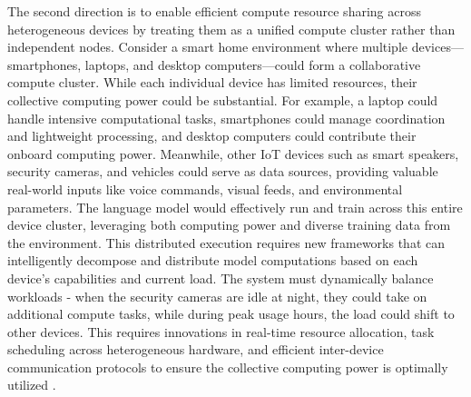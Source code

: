 The second direction is to enable efficient compute resource sharing across heterogeneous devices by treating them as a unified compute cluster rather than independent nodes. Consider a smart home environment where multiple devices—smartphones, laptops, and desktop computers—could form a collaborative compute cluster. While each individual device has limited resources, their collective computing power could be substantial. For example, a laptop could handle intensive computational tasks, smartphones could manage coordination and lightweight processing, and desktop computers could contribute their onboard computing power. Meanwhile, other IoT devices such as smart speakers, security cameras, and vehicles could serve as data sources, providing valuable real-world inputs like voice commands, visual feeds, and environmental parameters. The language model would effectively run and train across this entire device cluster, leveraging both computing power and diverse training data from the environment.
This distributed execution requires new frameworks that can intelligently decompose and distribute model computations based on each device's capabilities and current load. The system must dynamically balance workloads - when the security cameras are idle at night, they could take on additional compute tasks, while during peak usage hours, the load could shift to other devices. 
This requires innovations in real-time resource allocation, task scheduling across heterogeneous hardware, and efficient inter-device communication protocols to ensure the collective computing power is optimally utilized \citep{zhao2024retrieval}.





